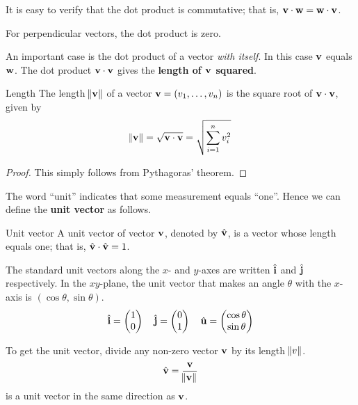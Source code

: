 It is easy to verify that the dot product is commutative; that is, $\vb{v} \cdot \vb{w} = \vb{w} \cdot \vb{v}$.

For perpendicular vectors, the dot product is zero.

An important case is the dot product of a vector \emph{with itself}. In this case $\vb{v}$ equals $\vb{w}$. The dot product $\vb{v} \cdot \vb{v}$ gives the \textbf{length of $\vb{v}$ squared}.

\begin{defn}{Length}{}
The length $\norm{\vb{v}}$ of a vector $\vb{v}=(v_1,\dots,v_n)$ is the square root of $\vb{v}\cdot\vb{v}$, given by
\begin{equation}
\norm{\vb{v}} = \sqrt{\vb{v}\cdot\vb{v}} = \sqrt{\sum_{i=1}^nv_i^2}
\end{equation}
\end{defn}

\begin{proof}
This simply follows from Pythagoras' theorem.
\end{proof}

The word ``unit” indicates that some measurement equals ``one”. Hence we can define the \textbf{unit vector} as follows.

\begin{defn}{Unit vector}{}
A unit vector of vector $\vb{v}$, denoted by $\hat{\vb{v}}$, is a vector whose length equals one; that is, $\hat{\vb{v}}\cdot\hat{\vb{v}}=1$.
\end{defn}

The standard unit vectors along the $x$- and $y$-axes are written $\hat{\vb{i}}$ and $\hat{\vb{j}}$ respectively. In the $xy$-plane, the unit vector that makes an angle $\theta$ with the $x$-axis is $(\cos\theta,\sin\theta)$.
\[ \hat{\vb{i}}=\begin{pmatrix} 1 \\ 0 \end{pmatrix} \quad \hat{\vb{j}}=\begin{pmatrix} 0 \\ 1 \end{pmatrix} \quad \hat{\vb{u}}=\begin{pmatrix} \cos\theta \\ \sin\theta \end{pmatrix} \]

To get the unit vector, divide any non-zero vector $\vb{v}$ by its length $\norm{v}$.
\begin{equation}
\hat{\vb{v}} = \frac{\vb{v}}{\norm{\vb{v}}}
\end{equation}
is a unit vector in the same direction as $\vb{v}$.

